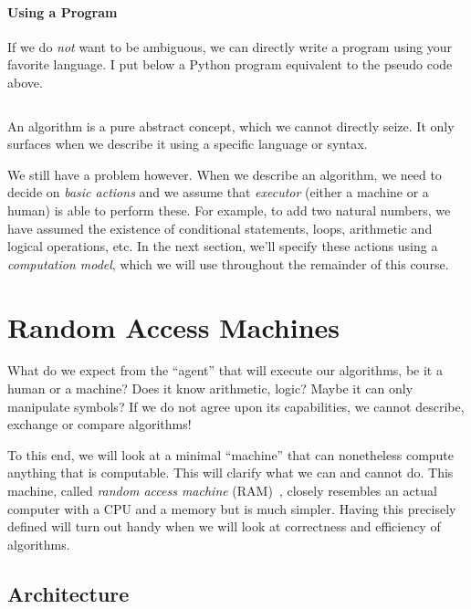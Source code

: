 \documentclass {aldast}
\begin{document}
\paragraph{Using a Program} If we do \emph{not} want to be ambiguous,
we can directly write a program using your favorite language. I
put below a Python program equivalent to the pseudo code
above.

\inputminted{python}{code/sum.py}

\begin{takeaway}
  An algorithm is a pure abstract concept, which we cannot directly
  seize. It only surfaces when we describe it using a specific language
  or syntax.
\end{takeaway}

We still have a problem however. When we describe an algorithm, we
need to decide on \emph{basic actions} and we assume that
\emph{executor} (either a machine or a human) is able to perform
these. For example, to add two natural numbers, we have assumed the
existence of conditional statements, loops, arithmetic and logical
operations, etc. In the next section, we'll specify these actions using a
\emph{computation model}, which we will use throughout the remainder
of this course.

 
\section{Random Access Machines}

What do we expect from the ``agent'' that will execute our algorithms, be
it a human or a machine? Does it know arithmetic, logic? Maybe it can
only manipulate symbols? If we do not agree upon its capabilities, we
cannot describe, exchange or compare algorithms!

To this end, we will look at a minimal ``machine'' that can
nonetheless compute anything that is computable. This will clarify
what we can and cannot do. This machine, called \emph{random access
  machine} (RAM)~\cite{cook1973}, closely resembles an actual computer
with a CPU and a memory but is much simpler. Having this precisely
defined will turn out handy when we will look at correctness and
efficiency of algorithms.

\subsection{Architecture}
\end{document}
